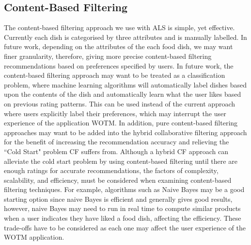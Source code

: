 \subsection{Content-Based Filtering}
The content-based filtering approach we use with ALS is simple, yet effective. Currently each dish is categorised by three attributes and is manually labelled. In future work, depending on the attributes of the each food dish, we may want finer granularity, therefore, giving more precise content-based filtering recommendations based on preferences specified by users.  In future work, the content-based filtering approach may want to be treated as a classification problem, where machine learning algorithms will automatically label dishes based upon the contents of the dish and automatically learn what the user likes based on previous rating patterns. This can be used instead of the current approach where users explicitly label their preferences, which may interrupt the user experience of the application WOTM. In addition, pure content-based filtering approaches may want to be added into the hybrid collaborative filtering approach for the benefit of increasing the recommendation accuracy and relieving the ``Cold Start" problem CF suffers from. Although a hybrid CF approach can alleviate the cold start problem by using content-based filtering until there are enough ratings for accurate recommendations, the factors of complexity, scalability, and efficiency, must be considered when examining content-based filtering techniques. For example, algorithms such as Naive Bayes may be a good starting option since naive Bayes is efficient and generally gives good results, however, naive Bayes may need to run in real time to compute similar products when a user indicates they have liked a food dish, affecting the efficiency. These trade-offs have to be considered as each one may affect the user experience of the WOTM application. 

